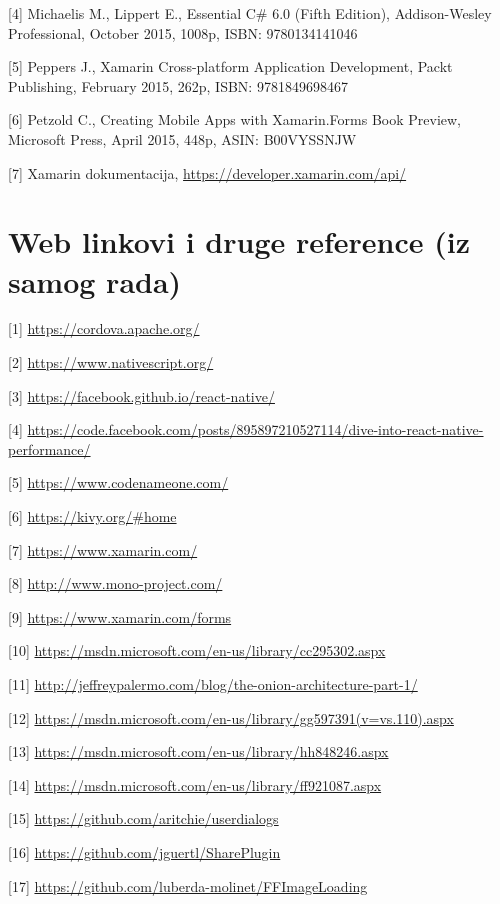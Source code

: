 \documentclass[a4paper]{article}
\begin{document}
[4] Michaelis M., Lippert E., Essential C\# 6.0 (Fifth Edition),
Addison-Wesley Professional, October 2015, 1008p, ISBN: 9780134141046 

[5] Peppers J., Xamarin Cross-platform Application Development, Packt
Publishing, February 2015, 262p, ISBN: 9781849698467 

[6] Petzold C., Creating Mobile Apps with Xamarin.Forms Book Preview,
Microsoft Press, April 2015, 448p, ASIN: B00VYSSNJW 

[7] Xamarin dokumentacija, \url{https://developer.xamarin.com/api/} 

\clearpage\section[Web linkovi i druge reference (iz samog rada)]{Web
linkovi i druge reference (iz samog rada)}
\hypertarget{RefHeadingToc1454255603686}{}[1]
\url{https://cordova.apache.org/} 

[2] \url{https://www.nativescript.org/} 

[3] \url{https://facebook.github.io/react-native/} 

[4]
\url{https://code.facebook.com/posts/895897210527114/dive-into-react-native-performance/}

[5] \url{https://www.codenameone.com/} 

[6] \url{https://kivy.org/#home} 

[7] \url{https://www.xamarin.com/} 

[8] \url{http://www.mono-project.com/} 

[9] \url{https://www.xamarin.com/forms} 

[10] \url{https://msdn.microsoft.com/en-us/library/cc295302.aspx} 

[11] \url{http://jeffreypalermo.com/blog/the-onion-architecture-part-1/}


[12]
\url{https://msdn.microsoft.com/en-us/library/gg597391(v=vs.110).aspx} 

[13] \url{https://msdn.microsoft.com/en-us/library/hh848246.aspx} 

[14] \url{https://msdn.microsoft.com/en-us/library/ff921087.aspx} 

[15] \url{https://github.com/aritchie/userdialogs} 

[16] \url{https://github.com/jguertl/SharePlugin} 

[17] \url{https://github.com/luberda-molinet/FFImageLoading} 


\bigskip
\end{document}

